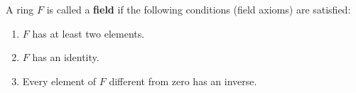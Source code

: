 A ring $F$ is called a \textbf{field} if the following conditions (field axioms) are satisfied:
\begin{enumerate}
\item[$F_1$.] $F$ has at least two elements.
\item[$F_2$.] $F$ has an identity.
\item[$F_3$.] Every element of $F$ different from zero has an inverse.
\end{enumerate}
